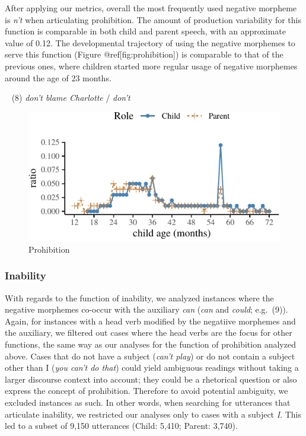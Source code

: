 \documentclass[10pt, letterpaper]{article}
\newenvironment{CodeChunk}{}{}
\begin{document}
After applying our metrics, overall the most frequently used negative
morpheme is \emph{n't} when articulating prohibition. The amount of
production variability for this function is comparable in both child and
parent speech, with an approximate value of 0.12. The developmental
trajectory of using the negative morphemes to serve this function
(Figure @ref{[}fig:prohibition{]}) is comparable to that of the previous
ones, where children started more regular usage of negative morphemes
around the age of 23 months.

~ (8) \emph{don't blame Charlotte} / \emph{don't}

\begin{CodeChunk}
\begin{figure}[H]

{\centering \includegraphics{figs/prohibition-1} 

}

\caption[Prohibition]{Prohibition}\label{fig:prohibition}
\end{figure}
\end{CodeChunk}

\hypertarget{inability}{%
\subsubsection{Inability}\label{inability}}

With regards to the function of inability, we analyzed instances where
the negative morphemes co-occur with the auxiliary \emph{can}
(\emph{can} and \emph{could}; e.g.~(9)). Again, for instances with a
head verb modified by the negatiive morphemes and the auxiliary, we
filtered out cases where the head verbs are the focus for other
functions, the same way as our analyses for the function of prohibition
analyzed above. Cases that do not have a subject (\emph{can't play}) or
do not contain a subject other than I (\emph{you can't do that}) could
yield ambiguous readings without taking a larger discourse context into
account; they could be a rhetorical question or also express the concept
of prohibition. Therefore to avoid potential ambiguity, we excluded
instances as such. In other words, when searching for utterances that
articulate inability, we restricted our analyses only to cases with a
subject \emph{I}. This led to a subset of 9,150 utterances (Child:
5,410; Parent: 3,740).
\end{document}
